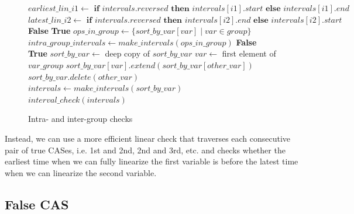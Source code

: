 \documentclass[oneside, a4paper, onecolumn, 10pt]{article}
\begin{document}
\begin{figure}[h!]
  \begin{algorithmic}[1]
    \State $earliest\_lin\_i1 \gets \textbf{ if } intervals.reversed  \textbf{ then } intervals[i1].start \textbf{ else } intervals[i1].end$
    \State $latest\_lin\_i2 \gets \textbf{ if } intervals.reversed  \textbf{ then } intervals[i2].end \textbf{ else } intervals[i2].start$
    \State \Return \textbf{False}
    \EndIf
    \EndFor
    \State \Return \textbf{True}
    \EndFunction
    \State
    \State $ops\_in\_group \gets \{sort\_by\_var[var] \mid var \in group\}$
    \State $intra\_group\_intervals \gets make\_intervals(ops\_in\_group)$
    \State \Return \textbf{False}
    \EndIf
    \EndFor
    \State \Return \textbf{True}
    \EndFunction
    \State
    \State $sort\_by\_var \gets$ deep copy of $sort\_by\_var$
    \State $var \gets$ first element of $ var\_group$
    \State $sort\_by\_var[var].extend(sort\_by\_var[other\_var])$
    \State $sort\_by\_var.delete(other\_var)$
    \EndFor
    \EndFor
    \State $intervals \gets make\_intervals(sort\_by\_var)$
    \State \Return $interval\_check(intervals)$
    \EndFunction
  \end{algorithmic}
  \caption{\label{IntraInter Group Checks}Intra- and inter-group checks}
\end{figure}
\noindent
Instead, we can use a more efficient linear check that traverses each consecutive pair of true CASes, i.e. 1st and 2nd, 2nd and 3rd, etc. and checks whether the earliest time when we can fully linearize the first variable is before the latest time when we can linearize the second variable.
\subsection{False CAS}
\end{document}
